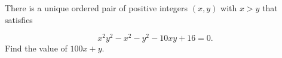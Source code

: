 There is a unique ordered pair of positive integers $(x,y)$ with $x>y$ that satisfies

\[
x^2y^2-x^2-y^2-10xy+16=0.
\]Find the value of $100x+y$.
